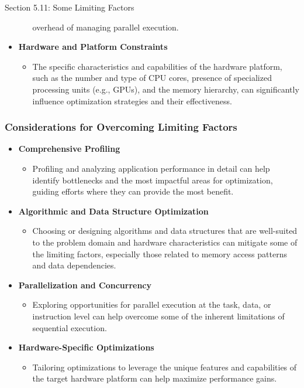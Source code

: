 \begin{notes}{Section 5.11: Some Limiting Factors}
\begin{itemize}
\begin{itemize}
            overhead of managing parallel execution.
        \end{itemize}
        \item \textbf{Hardware and Platform Constraints}
        \begin{itemize}
            \item The specific characteristics and capabilities of the hardware platform, such as the number and type of CPU cores, presence of specialized processing units (e.g., GPUs), and the memory 
            hierarchy, can significantly influence optimization strategies and their effectiveness.
        \end{itemize}
    \end{itemize}
    
    \subsubsection*{Considerations for Overcoming Limiting Factors}
    
    \begin{itemize}
        \item \textbf{Comprehensive Profiling}
        \begin{itemize}
            \item Profiling and analyzing application performance in detail can help identify bottlenecks and the most impactful areas for optimization, guiding efforts where they can provide the 
            most benefit.
        \end{itemize}
        \item \textbf{Algorithmic and Data Structure Optimization}
        \begin{itemize}
            \item Choosing or designing algorithms and data structures that are well-suited to the problem domain and hardware characteristics can mitigate some of the limiting factors, especially 
            those related to memory access patterns and data dependencies.
        \end{itemize}
        \item \textbf{Parallelization and Concurrency}
        \begin{itemize}
            \item Exploring opportunities for parallel execution at the task, data, or instruction level can help overcome some of the inherent limitations of sequential execution.
        \end{itemize}
        \item \textbf{Hardware-Specific Optimizations}
        \begin{itemize}
            \item Tailoring optimizations to leverage the unique features and capabilities of the target hardware platform can help maximize performance gains.
        \end{itemize}
    \end{itemize}
    

\end{notes}
